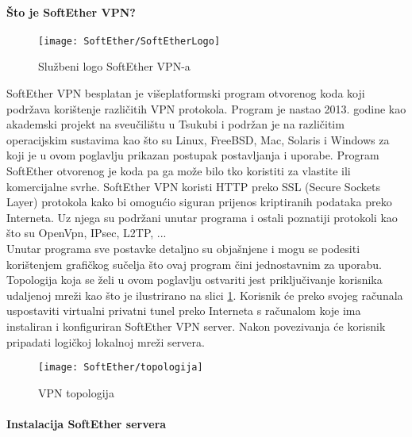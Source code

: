 \bigbreak
\paragraph*{Što je SoftEther VPN?}
\hfill \smallbreak
\begin{wrapfigure}{r}{0.5\textwidth} 
     \centering
     \texttt{[image: SoftEther/SoftEtherLogo]}
	\caption{Službeni logo SoftEther VPN-a}
\end{wrapfigure}

SoftEther VPN\cite{softether} besplatan je višeplatformski program otvorenog koda koji podržava korištenje različitih VPN protokola. Program je nastao 2013. godine kao akademski projekt na sveučilištu u Tsukubi i podržan je na različitim operacijskim sustavima kao što su Linux, FreeBSD, Mac, Solaris i Windows za koji je u ovom poglavlju prikazan postupak postavljanja i uporabe.
\smallbreak
Program SoftEther otvorenog je koda pa ga može bilo tko koristiti za vlastite ili komercijalne svrhe.\smallbreak
SoftEther VPN koristi HTTP preko SSL (Secure Sockets Layer)\cite{ssl}
protokola kako bi omogućio siguran prijenos kriptiranih podataka preko Interneta. Uz njega su podržani unutar programa i ostali poznatiji protokoli kao što su OpenVpn, IPsec, L2TP, ...\\
Unutar programa sve postavke detaljno su objašnjene i mogu se podesiti korištenjem grafičkog sučelja što ovaj program čini jednostavnim za uporabu.\\
\FloatBarrier
\smallbreak
Topologija koja se želi u ovom poglavlju ostvariti jest priključivanje korisnika udaljenoj mreži kao što je ilustrirano na slici \ref{fig:topologija-soft}. Korisnik će preko svojeg računala uspostaviti virtualni privatni tunel preko Interneta s računalom koje ima instaliran i konfiguriran SoftEther VPN server. Nakon povezivanja će korisnik pripadati logičkoj lokalnoj mreži servera.
\begin{figure}[h!]
	\centering
     \texttt{[image: SoftEther/topologija]}
     \caption{VPN topologija}
     \label{fig:topologija-soft}
\end{figure}

\newpage
\paragraph*{Instalacija SoftEther servera}

